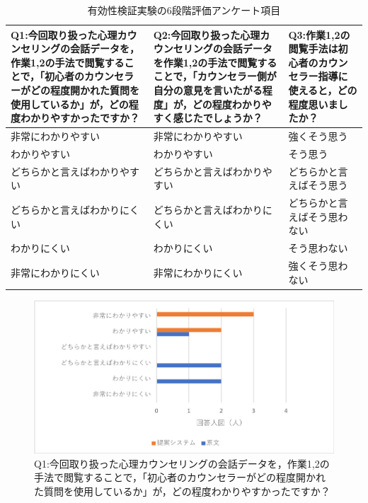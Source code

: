 \documentclass[shuuron]{kuee}
\begin{document}
\begin{table}
  \caption{有効性検証実験の6段階評価アンケート項目}
  \label{table:genbunAnke}
  \begin{center}
    \begin{tabular}{|p{4cm}|p{4cm}|p{4cm}|} \hline
      Q1:今回取り扱った心理カウンセリングの会話データを，作業1,2の手法で閲覧することで，「初心者のカウンセラーがどの程度開かれた質問を使用しているか」が，どの程度わかりやすかったですか？ & Q2:今回取り扱った心理カウンセリングの会話データを作業1,2の手法で閲覧することで，「カウンセラー側が自分の意見を言いたがる程度」が，どの程度わかりやすく感じたでしょうか？ & Q3:作業1,2の閲覧手法は初心者のカウンセラー指導に使えると，どの程度思いましたか？
      \\ \hline
       非常にわかりやすい & 非常にわかりやすい & 強くそう思う
      \\ \hline
      わかりやすい & わかりやすい & そう思う
      \\ \hline
      どちらかと言えばわかりやすい & どちらかと言えばわかりやすい & どちらかと言えばそう思う
      \\ \hline
      どちらかと言えばわかりにくい & どちらかと言えばわかりにくい & どちらかと言えばそう思わない
      \\ \hline
      わかりにくい & わかりにくい & そう思わない
      \\ \hline
      非常にわかりにくい & 非常にわかりにくい & 強くそう思わない
      \\ \hline
    \end{tabular}
  \end{center}
\end{table}

\begin{figure}
  \begin{center}
    \includegraphics[width=\linewidth]{q1.png}
  \end{center}
  \caption{Q1:今回取り扱った心理カウンセリングの会話データを，作業1,2の手法で閲覧することで，「初心者のカウンセラーがどの程度開かれた質問を使用しているか」が，どの程度わかりやすかったですか？}
  \label{fig:q1}
\end{figure}
\end{document}
